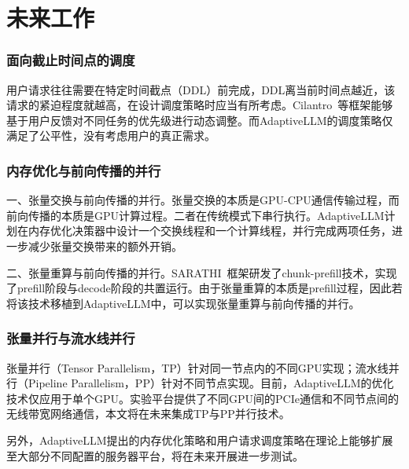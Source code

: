 \section{未来工作}

\subsubsection{面向截止时间点的调度}

用户请求往往需要在特定时间截点（DDL）前完成，DDL离当前时间点越近，该请求的紧迫程度就越高，在设计调度策略时应当有所考虑。Cilantro~\cite{Cilantro}等框架能够基于用户反馈对不同任务的优先级进行动态调整。而AdaptiveLLM的调度策略仅满足了公平性，没有考虑用户的真正需求。

\subsubsection{内存优化与前向传播的并行}

一、张量交换与前向传播的并行。张量交换的本质是GPU-CPU通信传输过程，而前向传播的本质是GPU计算过程。二者在传统模式下串行执行。AdaptiveLLM计划在内存优化决策器中设计一个交换线程和一个计算线程，并行完成两项任务，进一步减少张量交换带来的额外开销。

二、张量重算与前向传播的并行。SARATHI~\cite{SARATHI}框架研发了chunk-prefill技术，实现了prefill阶段与decode阶段的共置运行。由于张量重算的本质是prefill过程，因此若将该技术移植到AdaptiveLLM中，可以实现张量重算与前向传播的并行。

\subsubsection{张量并行与流水线并行} 

张量并行（Tensor Parallelism，TP）针对同一节点内的不同GPU实现；流水线并行（Pipeline Parallelism，PP）针对不同节点实现。目前，AdaptiveLLM的优化技术仅应用于单个GPU。实验平台提供了不同GPU间的PCIe通信和不同节点间的无线带宽网络通信，本文将在未来集成TP与PP并行技术。

另外，AdaptiveLLM提出的内存优化策略和用户请求调度策略在理论上能够扩展至大部分不同配置的服务器平台，将在未来开展进一步测试。

